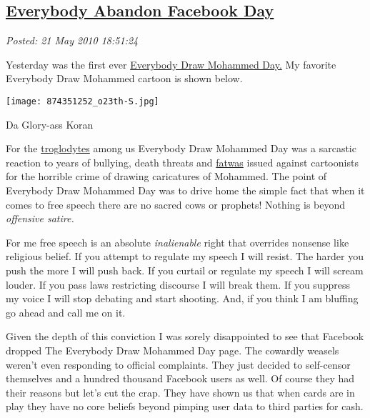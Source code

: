 %

\subsection*{\href{http://bakerjd99.wordpress.com/2010/05/21/everybody-abandon-facebook-day/}{Everybody Abandon Facebook Day}}


\noindent\emph{Posted: 21 May 2010 18:51:24}
\vspace{6pt}

Yesterday was the first ever
\href{http://www.foxnews.com/scitech/2010/05/19/facebook-fracas-breaks-everybody-draw-mohammad-day/\#}{Everybody
Draw Mohammed Day.} My favorite Everybody Draw Mohammed cartoon is shown
below.

\captionsetup[figure]{labelformat=empty}
\begin{floatingfigure}[r]{0.30\textwidth}
\centering
\texttt{[image: 874351252\_o23th-S.jpg]}
\caption{Da Glory-ass  Koran}
\label{fig:521X0}
\end{floatingfigure} For the \href{http://en.wikipedia.org/wiki/Troglodyte}{troglodytes}
among us Everybody Draw Mohammed Day was a sarcastic reaction to years
of bullying, death threats and
\href{http://islam.about.com/od/law/g/fatwa.htm}{fatwas} issued against
cartoonists for the horrible crime of drawing caricatures of Mohammed.
The point of Everybody Draw Mohammed Day was to drive home the simple
fact that when it comes to free speech there are no sacred cows or
prophets! Nothing is beyond \emph{offensive satire.}

For me free speech is an absolute \emph{inalienable} right that
overrides nonsense like religious belief. If you attempt to regulate my
speech I will resist. The harder you push the more I will push back. If
you curtail or regulate my speech I will scream louder. If you pass laws
restricting discourse I will break them. If you suppress my voice I will
stop debating and start shooting. And, if you think I am bluffing go
ahead and call me on it.

Given the depth of this conviction I was sorely disappointed to see that
Facebook dropped The Everybody Draw Mohammed Day page. The cowardly
weasels weren't even responding to official complaints. They just
decided to self-censor themselves and a hundred thousand Facebook users
as well. Of course they had their reasons but let's cut the crap. They
have shown us that when cards are in play they have no core beliefs
beyond pimping user data to third parties for cash.

